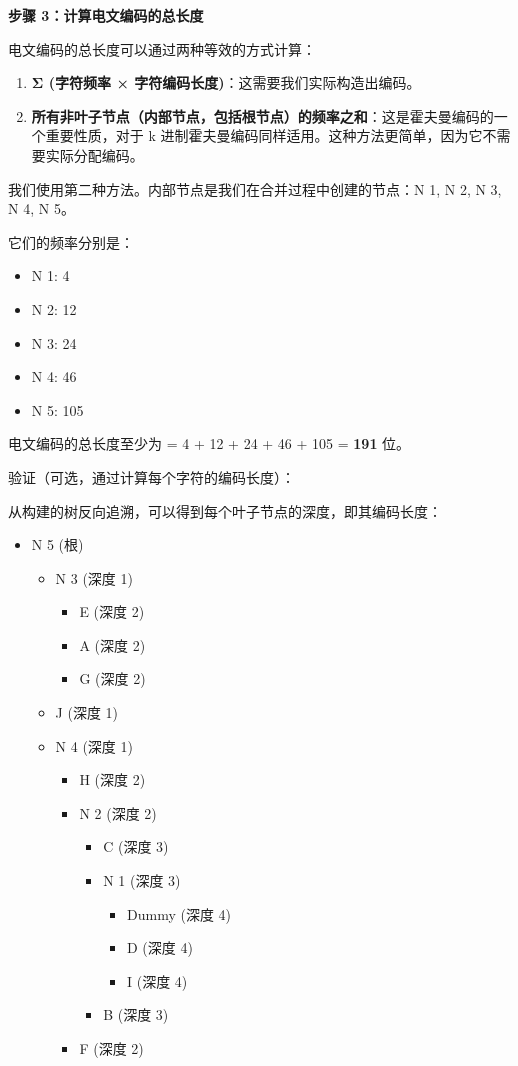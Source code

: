 \textbf{步骤 3：计算电文编码的总长度}

电文编码的总长度可以通过两种等效的方式计算：

\begin{enumerate}
	\item \textbf{Σ (字符频率 × 字符编码长度)}：这需要我们实际构造出编码。
	\item \textbf{所有非叶子节点（内部节点，包括根节点）的频率之和}：这是霍夫曼编码的一个重要性质，对于 k 进制霍夫曼编码同样适用。这种方法更简单，因为它不需要实际分配编码。
\end{enumerate}

我们使用第二种方法。内部节点是我们在合并过程中创建的节点：N 1, N 2, N 3, N 4, N 5。

它们的频率分别是：

\begin{itemize}
	\item N 1: 4
	\item N 2: 12
	\item N 3: 24
	\item N 4: 46
	\item N 5: 105
\end{itemize}

电文编码的总长度至少为 = 4 + 12 + 24 + 46 + 105 = \textbf{191} 位。

验证（可选，通过计算每个字符的编码长度）：

从构建的树反向追溯，可以得到每个叶子节点的深度，即其编码长度：

\begin{itemize}
	\item N 5 (根)
	\begin{itemize}
		\item N 3 (深度 1)
		\begin{itemize}
			\item E (深度 2)
			\item A (深度 2)
			\item G (深度 2)
		\end{itemize}
		\item J (深度 1)
		\item N 4 (深度 1)
		\begin{itemize}
			\item H (深度 2)
			\item N 2 (深度 2)
			\begin{itemize}
				\item C (深度 3)
				\item N 1 (深度 3)
				\begin{itemize}
					\item Dummy (深度 4)
					\item D (深度 4)
					\item I (深度 4)
				\end{itemize}
				\item B (深度 3)
			\end{itemize}
			\item F (深度 2)
		\end{itemize}
	\end{itemize}
\end{itemize}

